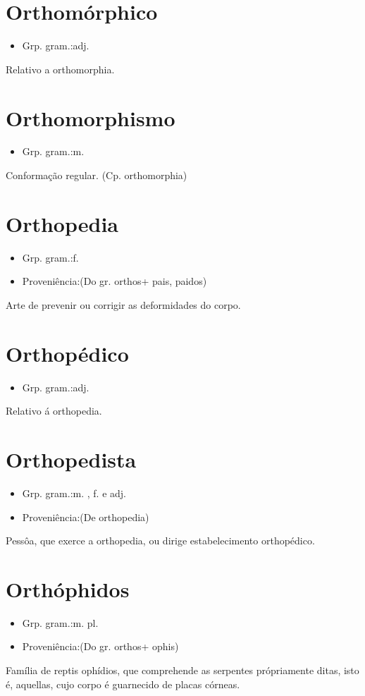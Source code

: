 \section{Orthomórphico}
\begin{itemize}
\item {Grp. gram.:adj.}
\end{itemize}
Relativo a orthomorphia.
\section{Orthomorphismo}
\begin{itemize}
\item {Grp. gram.:m.}
\end{itemize}
Conformação regular.
(Cp. \textunderscore orthomorphia\textunderscore )
\section{Orthopedia}
\begin{itemize}
\item {Grp. gram.:f.}
\end{itemize}
\begin{itemize}
\item {Proveniência:(Do gr. \textunderscore orthos\textunderscore  + \textunderscore pais\textunderscore , \textunderscore paidos\textunderscore )}
\end{itemize}
Arte de prevenir ou corrigir as deformidades do corpo.
\section{Orthopédico}
\begin{itemize}
\item {Grp. gram.:adj.}
\end{itemize}
Relativo á orthopedia.
\section{Orthopedista}
\begin{itemize}
\item {Grp. gram.:m. ,  f.  e  adj.}
\end{itemize}
\begin{itemize}
\item {Proveniência:(De \textunderscore orthopedia\textunderscore )}
\end{itemize}
Pessôa, que exerce a orthopedia, ou dirige estabelecimento orthopédico.
\section{Orthóphidos}
\begin{itemize}
\item {Grp. gram.:m. pl.}
\end{itemize}
\begin{itemize}
\item {Proveniência:(Do gr. \textunderscore orthos\textunderscore  + \textunderscore ophis\textunderscore )}
\end{itemize}
Família de reptis ophídios, que comprehende as serpentes própriamente ditas, isto é, aquellas, cujo corpo é guarnecido de placas córneas.
